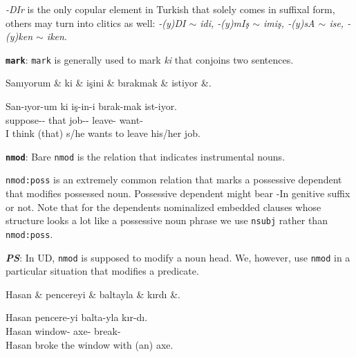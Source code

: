 \documentclass[11pt,a4paper]{article}
\begin{document}
\textit{-DIr} is the only copular element in Turkish that solely comes in suffixal form, others may turn into clitics as well: \textit{-(y)DI $\sim$ idi, -(y)mIş $\sim$ imiş, -(y)sA $\sim$ ise, -(y)ken $\sim$ iken}.

\textbf{\texttt{mark}}:
\texttt{mark} is generally used to mark \textit{ki} that conjoins two sentences.

\begin{exe}
\ex \label{mark}
\begin{dependency}
\begin{deptext}[column sep=0.32cm]
Sanıyorum \& ki \& işini \& bırakmak \& istiyor \&. \\
\end{deptext}
\end{dependency}
\gll San-ıyor-um ki iş-in-i bırak-mak ist-iyor.  \\
 suppose-\Prog{}-\Fsg{} that job-\Tsg{}-\Acc{} leave-\Nmlz{} want-\Prog{}\\
\glt I think (that) s/he wants to leave his/her job.
\end{exe}

\textbf{\texttt{nmod}}:
Bare \texttt{nmod} is the relation that indicates instrumental nouns.

\texttt{nmod:poss} is an extremely common relation that marks a possessive dependent that modifies possessed noun. Possessive dependent might bear -In genitive suffix or not. Note that for the dependents nominalized embedded clauses whose structure looks a lot like a possessive noun phrase we use \texttt{nsubj} rather than \texttt{nmod:poss}.

\textbf{\textit{PS}}: In UD, \texttt{nmod} is supposed to modify a noun head. We, however, use \texttt{nmod} in a particular situation that modifies a predicate.

\begin{exe}
\ex \label{nmod}
\begin{dependency}
\begin{deptext}[column sep=0.25cm]
Hasan \& pencereyi \& baltayla \& kırdı \&. \\
\end{deptext}
\end{dependency}
\gll Hasan pencere-yi balta-yla kır-dı.  \\
Hasan window-\Acc{} axe-\Ins{} break-\Pst{} \\
\glt Hasan broke the window with (an) axe.
\end{exe}
\end{document}
